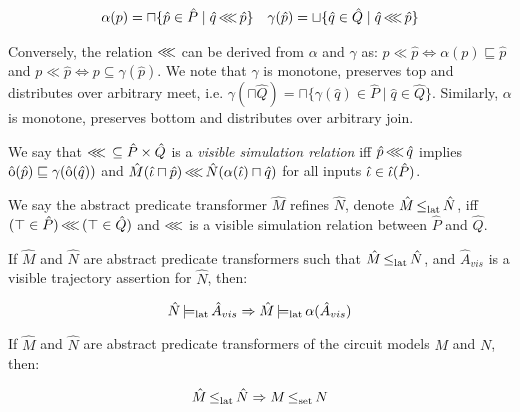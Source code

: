 \begin{align*}
\alpha(p) = \sqcap \{ \hat p \in \hat P \mid \hat q \operatorname{\lll} \hat p \} && \gamma(\hat p) = \sqcup \{ \hat q \in \hat Q \mid \hat q \operatorname{\lll} \hat p \}
\end{align*}

\noindent Conversely, the relation $\operatorname{\lll}$ can be derived from $\alpha$ and $\gamma$ as: $p \ll \hat p \iff \alpha(p) \sqsubseteq \hat p$ and $p \ll \hat p \iff p \subseteq \gamma(\hat p)$. We note that $\gamma$ is monotone, preserves top and distributes over arbitrary meet, i.e. $\gamma(\sqcap \hat Q) = \sqcap \{ \gamma(\hat q) \in \hat P \mid \hat q \in \hat Q\}$. Similarly, $\alpha$ is monotone, preserves bottom and distributes over arbitrary join.

We say that $\operatorname{\lll} \, \subseteq \hat P \times \hat Q$ is a \textit{visible simulation relation} iff $\hat p \operatorname{\lll} \hat q$ implies $\operatorname{\hat{\mathrm{o}}}(\hat p) \sqsubseteq \gamma(\operatorname{\hat{\mathrm{o}}}(\hat q))$ and $\hat M(\hat \iota \sqcap \hat p) \operatorname{\lll} \hat N(\alpha(\hat \iota) \sqcap \hat q)$ for all inputs $\hat \iota \in \operatorname{\hat{\iota}}(\hat P)$.

We say the abstract predicate transformer $\hat M$ refines $\hat N$, denote $\hat M \operatorname{\operatorname{\leq}_{\textrm{lat}}} \hat N$, iff $(\top \in \hat P) \operatorname{\lll} \, (\top \in \hat Q)$ and $\operatorname{\lll}$ is a visible simulation relation between $\hat P$ and $\hat Q$.


\begin{theorem} \label{thm:refinement-lat}
If $\hat M$ and $\hat N$ are abstract predicate transformers such that $\hat M \operatorname{\operatorname{\leq}_{\textrm{lat}}} \hat N$, and $\hat A_{vis}$ is a visible trajectory assertion for $\hat N$, then:

\begin{equation*}
\hat N \operatorname{\models_{\textrm{lat}}} \hat A_{vis} \Rightarrow \hat M \operatorname{\models_{\textrm{lat}}} \alpha(\hat A_{vis})
\end{equation*}
\end{theorem}

\begin{theorem} \label{thm:refinement-impl}
If $\hat M$ and $\hat N$ are abstract predicate transformers of the circuit models $M$ and $N$, then:

\begin{equation*}
\hat M \operatorname{\operatorname{\leq}_{\textrm{lat}}} \hat N \Rightarrow M \operatorname{\operatorname{\leq}_{\textrm{set}}} N
\end{equation*}
\end{theorem}
